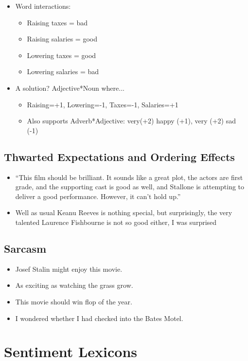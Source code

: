 \documentclass[11pt]{article}
\theoremstyle{definition}
\begin{document}
\begin{itemize}
  \item Word interactions:
  \begin{itemize}
    \item Raising taxes = bad
    \item Raising salaries = good
    \item Lowering taxes = good
    \item Lowering salaries = bad
  \end{itemize}
  \item A solution? Adjective*Noun where...
  \begin{itemize}
    \item Raising=+1, Lowering=-1, Taxes=-1, Salaries=+1
    \item Also supports Adverb*Adjective: very(+2) happy (+1), very (+2) sad (-1)
  \end{itemize}
\end{itemize}

\subsection{Thwarted Expectations
and Ordering Effects}
\begin{itemize}
  \item “This film should be brilliant. It sounds like a great plot, the actors are first
  grade, and the supporting cast is good as well, and Stallone is attempting to
  deliver a good performance. However, it can’t hold up.”
  \item Well as usual Keanu Reeves is nothing special, but surprisingly, the very
  talented Laurence Fishbourne is not so good either, I was surprised
\end{itemize}

\subsection{Sarcasm}
\begin{itemize}
  \item Josef Stalin might enjoy this movie.
  \item As exciting as watching the grass grow.
  \item This movie should win flop of the year.
  \item I wondered whether I had checked into the Bates Motel.
\end{itemize}

\section{Sentiment Lexicons}
\end{document}

